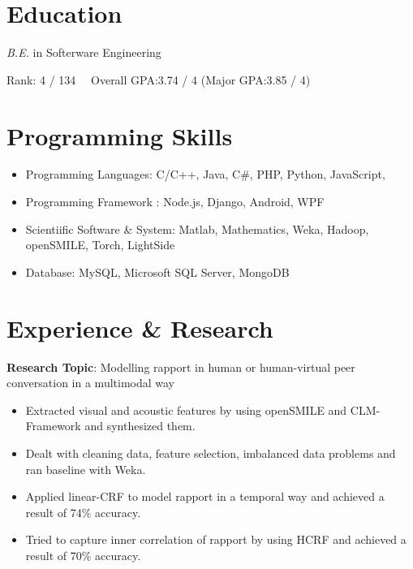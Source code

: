 \documentclass{resume}
\begin{document}




% 
% 
\section{Education}

\textit{B.E.} in Softerware Engineering

Rank: 4 / 134 \ \  Overall GPA:3.74 / 4 (Major GPA:3.85 / 4)


%
%


\section{Programming Skills}
\begin{itemize}[parsep=0.5ex]
  \item Programming Languages: C/C++, Java, C\#, PHP, Python, JavaScript, 
  \item Programming Framework :  Node.js, Django, Android, WPF
  \item Scientiific Software \& System: Matlab, Mathematics, Weka, Hadoop, openSMILE, Torch, LightSide
  \item Database: MySQL, Microsoft SQL Server, MongoDB
\end{itemize}


%
%

\section{Experience \& Research}
\textbf{Research Topic}:  Modelling rapport in human or human-virtual peer conversation in a multimodal way
\begin{itemize}
  \item Extracted visual and acoustic features by using openSMILE and CLM-Framework and synthesized them.
  \item Dealt with cleaning data, feature selection, imbalanced data problems and ran baseline  with Weka.
  \item Applied linear-CRF to model rapport in a temporal way and achieved a result of 74\% accuracy.
  \item Tried to capture inner correlation of rapport by using HCRF and achieved a result of 70\% accuracy.
\end{itemize}
\end{document}
